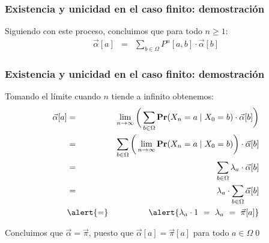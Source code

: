\begin{frame}
\frametitle{Existencia y unicidad en el caso finito: demostración}


{\small

Siguiendo con este proceso, concluimos que para todo $n \geq 1$:
\begin{eqnarray*}
\vec \alpha[a] & = & \sum_{b \in \Omega} P^n[a,b] \cdot \vec \alpha[b]
\end{eqnarray*}






}


\end{frame}



\begin{frame}
\frametitle{Existencia y unicidad en el caso finito: demostración}

{\footnotesize

Tomando el límite cuando $n$ tiende a infinito obtenemos:
\begin{eqnarray*}
\vec \alpha[a] & = & \lim_{n \to \infty} \bigg(\sum_{b \in \Omega} \pr(X_n = a \mid X_0 = b) \cdot \vec \alpha[b]\bigg)\\
& = &  \sum_{b \in \Omega} \bigg(\lim_{n \to \infty}\pr(X_n = a \mid X_0 = b)\bigg) \cdot \vec \alpha[b]\\
& = &  \sum_{b \in \Omega} \lambda_a \cdot \vec \alpha[b]\\
& = &  \lambda_a \cdot  \sum_{b \in \Omega} \vec \alpha[b]\\
& \alert{=} &  \alert{\lambda_a \cdot 1 \ = \ \lambda_a \ = \  \vec \pi[a]}
\end{eqnarray*}


Concluimos que $\vec \alpha = \vec \pi$, puesto que $\vec \alpha[a] = \vec \pi[a]$ para todo $a \in \Omega$\qed

}


\end{frame}



